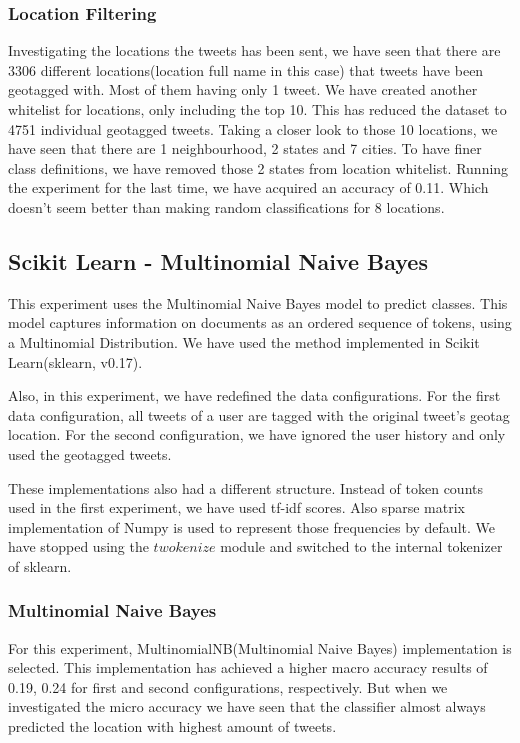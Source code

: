 \documentclass[twoside,11pt]{article}
\begin{document}
\subsubsection{Location Filtering}
Investigating the locations the tweets has been sent, we have seen that there are 3306 different locations(location full name in this case) that tweets have been geotagged with. Most of them having only 1 tweet. We have created another whitelist for locations, only including the top 10. This has reduced the dataset to 4751 individual geotagged tweets. Taking a closer look to those 10 locations, we have seen that there are 1 neighbourhood, 2 states and 7 cities. To have finer class definitions, we have removed those 2 states from location whitelist. Running the experiment for the last time, we have acquired an accuracy of 0.11. Which doesn't seem better than making random classifications for 8 locations.

\subsection{Scikit Learn - Multinomial Naive Bayes}
This experiment uses the Multinomial Naive Bayes model to predict classes. This model captures information on documents as an ordered sequence of tokens\cite{mccallum1998comparison}, using a Multinomial Distribution. We have used the method implemented in Scikit Learn\cite{scikit-learn}(sklearn, v0.17).

Also, in this experiment, we have redefined the data configurations. For the first data configuration, all tweets of a user are tagged with the original tweet's geotag location.  For the second configuration, we have ignored the user history and only used the geotagged tweets.

These implementations also had a different structure. Instead of token counts used in the first experiment, we have used tf-idf scores. Also sparse matrix implementation of Numpy is used to represent those frequencies by default. We have stopped using the $twokenize$ module and switched to the internal tokenizer of sklearn.

\subsubsection{Multinomial Naive Bayes}

For this experiment, MultinomialNB(Multinomial Naive Bayes) implementation is selected. This implementation has achieved a higher macro accuracy results of 0.19, 0.24 for first and second configurations, respectively. But when we investigated the micro accuracy we have seen that the classifier almost always predicted the location with highest amount of tweets.
\end{document}
